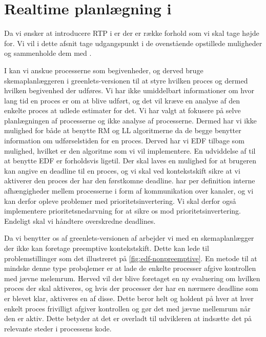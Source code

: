 \section{Realtime planlægning i \pycsp}
\label{sec:rtp-pycsp}

Da vi ønsker at introducere RTP i \pycsp er der er række forhold som vi skal tage højde for. Vi vil i dette afsnit tage udgangspunkt i de ovenstående opstillede muligheder og sammenholde dem med \pycsp. 

I \pycsp kan vi anskue processerne som begivenheder, og derved bruge skemaplanlæggeren i greenlets-versionen til at styre hvilken proces og dermed hvilken begivenhed der udføres. Vi har ikke umiddelbart informationer om hvor lang tid en proces er om at blive udført, og det vil kræve en analyse af den enkelte proces at udlede estimater for det. Vi har valgt at fokusere på selve planlægningen af processerne og ikke analyse af processerne. Dermed har vi ikke mulighed for både at benytte RM og LL algoritmerne da de begge benytter information om udførselstiden for en proces. Derved har vi EDF tilbage som mulighed, hvilket er den algoritme som vi vil implementere. En udviddelse af \pycsp til at benytte EDF er forholdsvis ligetil. Der skal laves en mulighed for at brugeren kan angive en deadline til en proces, og vi skal ved kontekstskift sikre at vi aktiverer den proces der har den førstkomne deadline. \pycsp har per definition interne afhængigheder mellem processerne i form af kommunikation over kanaler, og vi kan derfor opleve problemer med prioritetsinvertering. Vi skal derfor også implementere prioritetsnedarvning for at sikre os mod prioritetsinvertering. Endeligt skal vi håndtere overskredne deadlines.

Da vi benytter os af greenlets-versionen af \pycsp arbejder vi med en skemaplanlægger der ikke kan foretage preemptive kontekstskift. Dette kan lede til problemstillinger som det illustreret på \cref{fig:edf-nonpreemptive}. En metode til at mindske denne type probqlemer er at lade de enkelte processer afgive kontrollen med jævne melemrum. Herved vil der blive foretaget en ny evaluering om hvilken proces der skal aktiveres, og hvis der processer der har en nærmere deadline som er blevet klar, aktiveres en af disse. Dette beror helt og holdent på hver at hver enkelt proces frivilligt afgiver kontrollen og gør det med jævne mellemrum når den er aktiv. Dette betyder at det er overladt til udvikleren at indsætte det på relevante steder i processens kode. 



